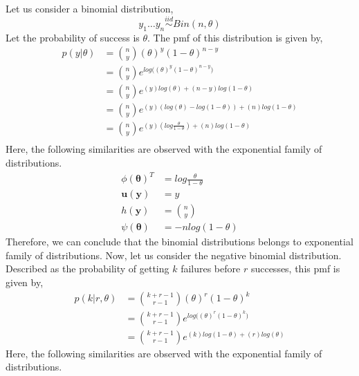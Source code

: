 \documentclass[11pt]{article}
\begin{document}
Let us consider a binomial distribution,
\begin{equation}
  \nonumber
  y_{1} \dots y_{n} \overset{iid}{\sim} Bin(n, \theta)
\end{equation}
Let the probability of success is $\theta$. The pmf of this distribution is given by,
\begin{equation}
  \nonumber
  \begin{aligned}
    p(y | \theta) & = {n \choose y}(\theta)^{y}(1 - \theta)^{n-y}\\
    & = {n \choose y} e^{log\big((\theta)^{y}(1 - \theta)^{n-y}\big)}\\
    & = {n \choose y} e^{(y)log(\theta) + (n-y)log(1-\theta)}\\
    & = {n \choose y} e^{(y)(log(\theta) - log(1 - \theta)) + (n)log(1-\theta)}\\
    & = {n \choose y} e^{(y)(log\frac{\theta}{1 - \theta}) + (n)log(1-\theta)}\\
  \end{aligned}
\end{equation}
Here, the following similarities are observed with the exponential family of distributions.
\begin{equation}
  \nonumber
  \begin{aligned}
    \phi(\bm{\theta})^{T} & = log\frac{\theta}{1 - \theta}\\
    \mathbf{u(y)} & = y\\
    h(\mathbf{y}) & = {n \choose y}\\
    \psi(\bm{\theta}) & = -nlog(1 - \theta)
  \end{aligned}
\end{equation}
Therefore, we can conclude that the binomial distributions belongs to exponential family of distributions. Now, let us consider the negative binomial distribution. Described as the probability of getting $k$ failures before $r$ successes, this pmf is given by,
\begin{equation}
  \nonumber
  \begin{aligned}
    p(k | r,\theta) & = {k + r - 1 \choose r-1}(\theta)^{r}(1 - \theta)^{k}\\
    & = {k + r - 1 \choose r-1}e^{log\big((\theta)^{r}(1 - \theta)^{k}\big)}\\
    & = {k + r - 1 \choose r-1}e^{(k)log(1-\theta) + (r)log(\theta)}
  \end{aligned}
\end{equation}
Here, the following similarities are observed with the exponential family of distributions.
\end{document}

